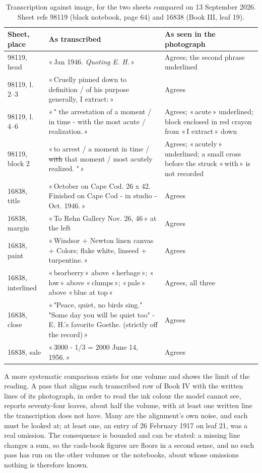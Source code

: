 \documentclass[11pt]{article}
\newcommand{\q}[1]{«\,#1\,»}
\begin{document}
\begin{table}[htbp]\centering\small
\caption{Transcription against image, for the two sheets compared on 13 September 2026. Sheet refs 98119 (black notebook, page 64) and 16838 (Book III, leaf 19).}\label{tab:compare}
\begin{tabular}{p{2.3cm}p{6.2cm}p{5.6cm}}\toprule
Sheet, place & As transcribed & As seen in the photograph\\\midrule
98119, head & \q{Jan 1946. \emph{Quoting E. H.}} & Agrees; the second phrase underlined\\
98119, l.\,2--3 & \q{Cruelly pinned down to definition / of his purpose generally, I extract:} & Agrees\\
98119, l.\,4--6 & \q{" the arrestation of a moment / in time - with the most acute / realization.} & Agrees; \q{acute} underlined; block enclosed in red crayon from \q{I extract} down\\
98119, block 2 & \q{to arrest / a moment in time / \sout{with} that moment / most acutely realized. "} & Agrees; \q{acutely} underlined; a small cross before the struck \q{with} is not recorded\\
16838, title & \q{October on Cape Cod. 26 x 42. Finished on Cape Cod - in studio - Oct. 1946.} & Agrees\\
16838, margin & \q{To Rehn Gallery Nov. 26, 46} at the left & Agrees\\
16838, paint & \q{Windsor + Newton linen canvas + Colors; flake white, linseed + turpentine.} & Agrees\\
16838, interlined & \q{bearberry} above \q{herbage}; \q{low} above \q{clumps}; \q{pale} above \q{blue at top} & Agrees, all three\\
16838, close & \q{"Peace, quiet, no birds sing." "Some day you will be quiet too" - E. H.'s favorite Goethe. (strictly off the record)} & Agrees\\
16838, sale & \q{3000 - 1/3 = 2000 June 14, 1956.} & Agrees\\\bottomrule
\end{tabular}
\end{table}

A more systematic comparison exists for one volume and shows the limit of the reading. A pass that aligns each transcribed row of Book IV with the written lines of its photograph, in order to read the ink colour the model cannot see, reports seventy-four leaves, about half the volume, with at least one written line the transcription does not have. Many are the alignment's own noise, and each must be looked at; at least one, an entry of 26 February 1917 on leaf 21, was a real omission. The consequence is bounded and can be stated: a missing line changes a sum, so the cash-book figures are floors in a second sense, and no such pass has run on the other volumes or the notebooks, about whose omissions nothing is therefore known.
\end{document}
